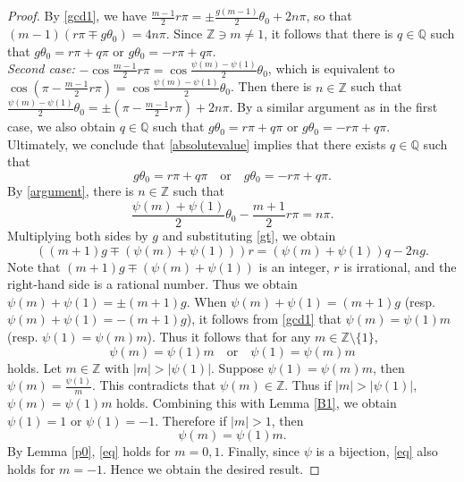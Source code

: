 \documentclass[10pt,a4paper]{amsart}
\begin{document}
\begin{proof}
By \eqref{gcd1}, we have $\frac{m-1}{2} r\pi =\pm \frac{g(m-1)}{2} \theta_0+2n\pi$, so that $(m-1)(r \pi \mp g\theta_0)=4n\pi$. Since $\mathbb{Z} \ni m \neq 1$, it follows that there is $q \in \mathbb{Q}$ such that 
$g \theta_0=r\pi + q\pi$ or $g \theta_0=-r\pi + q\pi$. \\
{\it{Second case:}} $-\cos \frac{m-1}{2} r\pi = \cos \frac{\psi(m)-\psi(1)}{2} \theta_0$, which is equivalent to $\cos ( \pi - \frac{m-1}{2} r\pi)= \cos \frac{\psi(m)-\psi(1)}{2} \theta_0$. Then there is $n \in \mathbb{Z}$ such that 
$\frac{\psi(m)-\psi(1)}{2} \theta_0=\pm (\pi - \frac{m-1}{2} r\pi)+2n \pi$.
By a similar argument as in the first case, we also obtain $q \in \mathbb{Q}$ such that 
$g \theta_0=r\pi + q\pi$ or $g \theta_0=-r\pi + q\pi$. \\ 
Ultimately, we conclude that \eqref{absolutevalue} implies that there exists $q \in \mathbb{Q}$ such that 
\begin{equation}\label{gt}
g \theta_0=r\pi + q\pi \quad \text{or}  \quad g \theta_0=-r\pi + q\pi.
\end{equation}
 By \eqref{argument}, there is $n \in \mathbb{Z}$ such that 
\[
\frac{\psi(m)+\psi(1)}{2}\theta_0-\frac{m+1}{2}r \pi=n \pi.
\]
Multiplying both sides by $g$ and substituting \eqref{gt}, we obtain 
\[
((m+1)g \mp (\psi(m)+\psi(1)))r =(\psi(m)+\psi(1))q -2ng.
\]
Note that $(m+1)g \mp (\psi(m)+\psi(1))$ is an integer, $r$ is irrational, and the right-hand side is a rational number. Thus we obtain $\psi(m)+\psi(1)=\pm (m+1)g$. When $\psi(m)+\psi(1)=(m+1)g$ (resp.  $\psi(m)+\psi(1)=-(m+1)g$), it follows from \eqref{gcd1} that
$\psi(m)=\psi(1)m$ (resp. $\psi(1)=\psi(m)m$).  Thus it follows that for any $m \in \mathbb{Z} \setminus \{1\} $, 
\[
\psi(m)=\psi(1)m  \quad \text{or} \quad \psi(1)=\psi(m)m
\]
holds. Let $m \in \mathbb{Z}$ with $|m|>|\psi(1)|$. Suppose $\psi(1)=\psi(m)m$, then $\psi(m)=\frac{\psi(1)}{m}$. This contradicts that  $\psi(m) \in \mathbb{Z}$. Thus if  $|m|>|\psi(1)|$, $\psi(m)=\psi(1)m$ holds.  Combining this with Lemma \ref{B1},  we obtain $\psi(1)=1$ or $\psi(1)=-1$. 
Therefore if  $|m|>1$, then 
\begin{equation}\label{eq}
\psi(m)=\psi(1)m.
\end{equation}
By Lemma \ref{p0}, \eqref{eq} holds for $m=0,1$.  Finally, since $\psi$ is a bijection, \eqref{eq}  also holds for $m=-1$. Hence we obtain the desired result.
\end{proof}
\end{document}
